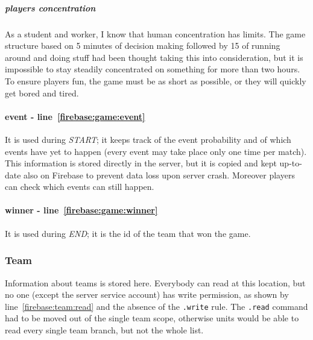 				\subparagraph{players concentration}
				As a student and worker, I know that human concentration has limits. The game structure based on 5 minutes of decision making followed by 15 of running around and doing stuff had been thought taking this into consideration, but it is impossible to stay steadily concentrated on something for more than two hours.
				To ensure players fun, the game must be as short as possible, or they will quickly get bored and tired.
				
				
				\paragraph{event - line~\ref{firebase:game:event}}
				It is used during \emph{START}; it keeps track of the event probability and of which events have yet to happen (every event may take place only one time per match). This information is stored directly in the server, but it is copied and kept up-to-date also on Firebase to prevent data loss upon server crash. Moreover players can check which events can still happen.
				
				\paragraph{winner - line~\ref{firebase:game:winner}}
				It is used during \emph{END}; it is the id of the team that won the game.
			
			\subsubsection{Team}
			
				
				
				Information about teams is stored here.
				Everybody can read at this location, but no one (except the server service account) has write permission, as shown by line~\ref{firebase:team:read} and the absence of the \lstinline|.write| rule.
				The \lstinline|.read| command had to be moved out of the single team scope, otherwise units would be able to read every single team branch, but not the whole list. \\
			
			
